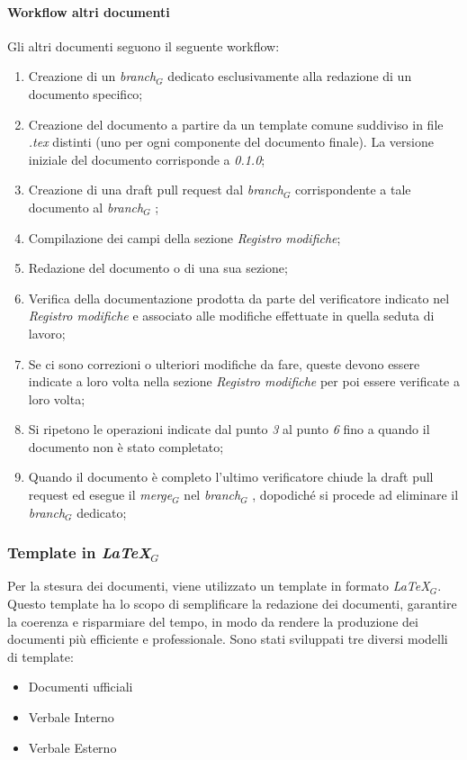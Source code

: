     \paragraph{Workflow altri documenti}
    Gli altri documenti seguono il seguente workflow:
    \begin{enumerate}
        \item Creazione di un \textit{branch}$_G$ dedicato esclusivamente alla redazione di un documento specifico;
        \item Creazione del documento a partire da un template comune 
        suddiviso in file \textit{.tex} distinti (uno per ogni componente del documento finale). La versione iniziale del documento corrisponde a \textit{0.1.0};
        \item Creazione di una draft pull request dal \textit{branch}$_G$ corrispondente a tale documento al \textit{branch}$_G$ ;
        \item Compilazione dei campi della sezione \textit{Registro modifiche};
        \item Redazione del documento o di una sua sezione;
        \item Verifica della documentazione prodotta da parte del verificatore indicato nel \textit{Registro modifiche} e associato alle modifiche effettuate in quella seduta di lavoro;
        \item Se ci sono correzioni o ulteriori modifiche da fare, queste 
        devono essere indicate a loro volta nella sezione \textit{Registro modifiche} per poi essere verificate a loro volta;
        \item Si ripetono le operazioni indicate dal punto \textit{3} al punto \textit{6} fino a quando il documento non è stato completato;
        \item Quando il documento è completo l'ultimo verificatore 
        chiude la draft pull request ed esegue il \textit{merge}$_G$ nel \textit{branch}$_G$ , dopodiché si procede ad eliminare il \textit{branch}$_G$ dedicato;
    \end{enumerate}

\subsubsection{Template in \textit{LaTeX}$_G$}
Per la stesura dei documenti, viene utilizzato un template in formato \textit{LaTeX}$_G$. Questo template ha lo scopo di semplificare la redazione dei documenti, garantire la coerenza e risparmiare del tempo, in modo da rendere la produzione dei documenti più efficiente e professionale. Sono stati sviluppati tre diversi modelli di template:
\begin{itemize}
    \item Documenti ufficiali
    \item Verbale Interno
    \item Verbale Esterno
\end{itemize}

